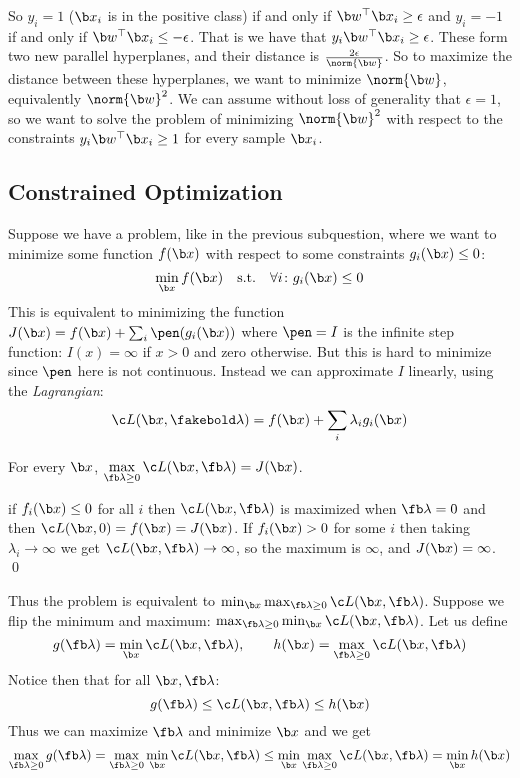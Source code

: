 So $y_i=1$ ($\b x_i$ is in the positive class) if and only if $\b w^\top\b x_i\geq\epsilon$ and $y_i=-1$ if and only if $\b w^\top\b x_i\leq-\epsilon$.
That is we have that $y_i\b w^\top\b x_i\geq\epsilon$.
These form two new parallel hyperplanes, and their distance is $\frac{2\epsilon}{\norm{\b w}}$.
So to maximize the distance between these hyperplanes, we want to minimize $\norm{\b w}$, equivalently $\norm{\b w}^2$.
We can assume without loss of generality that $\epsilon=1$, so we want to solve the problem of minimizing $\norm{\b w}^2$ with respect to the constraints $y_i\b w^\top\b x_i\geq1$ for every sample $\b x_i$.

\subsection{Constrained Optimization}

Suppose we have a problem, like in the previous subquestion, where we want to minimize some function $f(\b x)$ with respect to some constraints $g_i(\b x)\leq0$:
$$ \min_{\b x}f(\b x) \hbox{\quad s.t.\quad} \forall i\colon g_i(\b x)\leq 0 $$
This is equivalent to minimizing the function $J(\b x)=f(\b x) + \sum_i\pen(g_i(\b x))$ where $\pen=I$ is the infinite step function: $I(x)=\infty$ if $x>0$ and zero otherwise.
But this is hard to minimize since $\pen$ here is not continuous.
Instead we can approximate $I$ linearly, using the {\it Lagrangian}:
$$ \c L(\b x,\fakebold\lambda) = f(\b x) + \sum_i\lambda_ig_i(\b x) $$

\bprop

    For every $\b x$, $\max\limits_{\fb\lambda\geq0}\c L(\b x,\fb\lambda)=J(\b x)$.

\eprop

\Proof if $f_i(\b x)\leq0$ for all $i$ then $\c L(\b x,\fb\lambda)$ is maximized when $\fb\lambda=0$ and then $\c L(\b x,0)=f(\b x)=J(\b x)$.
If $f_i(\b x)>0$ for some $i$ then taking $\lambda_i\to\infty$ we get $\c L(\b x,\fb\lambda)\to\infty$, so the maximum is $\infty$, and $J(\b x)=\infty$.
\qed

Thus the problem is equivalent to $\min_{\b x}\max_{\fb\lambda\geq0}\c L(\b x,\fb\lambda)$.
Suppose we flip the minimum and maximum: $\max_{\fb\lambda\geq0}\min_{\b x}\c L(\b x,\fb\lambda)$.
Let us define
$$ g(\fb\lambda) = \min_{\b x}\c L(\b x,\fb\lambda),\qquad h(\b x) = \max_{\fb\lambda\geq0}\c L(\b x,\fb\lambda) $$
Notice then that for all $\b x,\fb\lambda$:
$$ g(\fb\lambda) \leq \c L(\b x,\fb\lambda) \leq h(\b x) $$
Thus we can maximize $\fb\lambda$ and minimize $\b x$ and we get
$$ \max_{\fb\lambda\geq0}g(\fb\lambda) = \max_{\fb\lambda\geq0}\min_{\b x}\c L(\b x,\fb\lambda) \leq \min_{\b x}\max_{\fb\lambda\geq0}\c L(\b x,\fb\lambda) = \min_{\b x}h(\b x) $$

